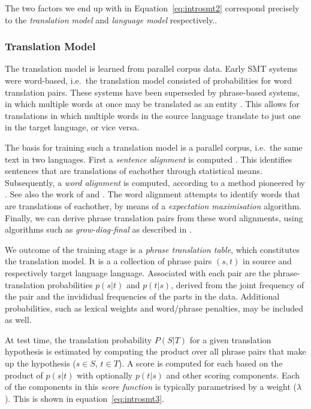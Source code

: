 The two factors we end up with in Equation~\ref{eq:introsmt2} correspond
precisely to the \emph{translation model} and \emph{language model}
respectively..

\subsubsection{Translation Model}

The translation model is learned from parallel corpus data. Early SMT systems
were word-based, i.e.\ the translation model consisted of probabilities for
word translation pairs. These systems have been superseded by phrase-based
systems, in which multiple words at once may be translated as an entity
\citep{PBSMT}. This allows for translations in which multiple words in the
source language translate to just one in the target language, or vice versa.

The basis for training such a translation model is a parallel corpus, i.e.\ the
same text in two languages. First a \emph{sentence alignment} is computed
\citep{TIEDEMANN}. This identifies sentences that are translations of eachother
through statistical means. Subsequently, a \emph{word alignment} is computed,
according to a method pioneered by \cite{BROWN}. See also the work of
\cite{OchNey2003} and \citep{TIEDEMANN}. The word alignment attempts to
identify words that are translations of eachother, by means of a
\emph{expectation maximisation} algorithm. Finally, we can derive phrase
translation pairs from these word alignments, using algorithms such as
\emph{grow-diag-final} as described in \citep{PBSMT}. 

We outcome of the training stage is a \emph{phrase translation table}, which
constitutes the translation model. It is a a collection of phrase pairs $(s,t)$
in source and respectively target language language. Associated with each pair
are the phrase-translation probabilities $p(s|t)$ and $p(t|s)$, derived from
the joint frequency of the pair and the invididual frequencies of the parts in
the data. Additional probabilities, such as lexical weights and word/phrase
penalties, may be included as well. 

At test time, the translation probability $P(S|T)$ for a given translation
hypothesis is estimated by computing the product over all phrase pairs that
make up the hypothesis ($s \in S$, $t \in T$). A score is computed for each
based on the product of $p(s|t)$ with optionally $p(t|s)$ and other scoring
components. Each of the components in this \emph{score function} 
is typically parametrised by a weight ($\lambda$). This is shown in equation~\ref{eq:introsmt3}.

